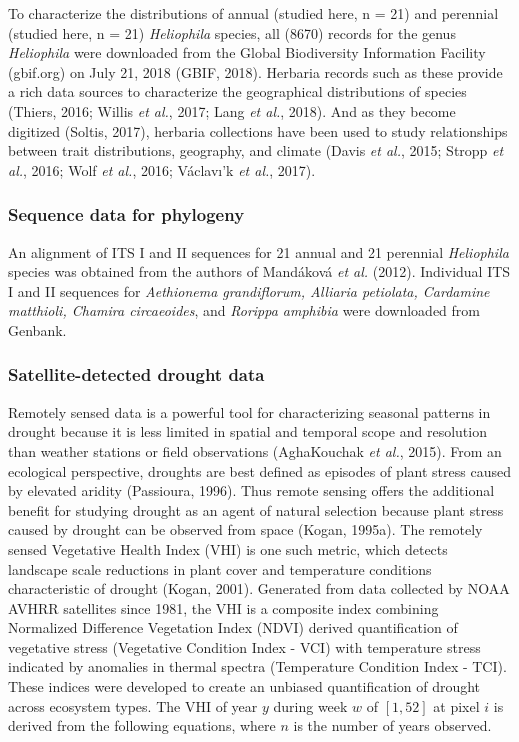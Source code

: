 \documentclass[man,floatsintext]{apa6}
\theoremstyle{definition}
\theoremstyle{definition}
\theoremstyle{definition}
\theoremstyle{remark}
\begin{document}
To characterize the distributions of annual (studied here, n = 21) and
perennial (studied here, n = 21) \emph{Heliophila} species, all (8670)
records for the genus \emph{Heliophila} were downloaded from the Global
Biodiversity Information Facility (gbif.org) on July 21, 2018 (GBIF,
2018). Herbaria records such as these provide a rich data sources to
characterize the geographical distributions of species (Thiers, 2016;
Willis \emph{et al.}, 2017; Lang \emph{et al.}, 2018). And as they
become digitized (Soltis, 2017), herbaria collections have been used to
study relationships between trait distributions, geography, and climate
(Davis \emph{et al.}, 2015; Stropp \emph{et al.}, 2016; Wolf \emph{et
al.}, 2016; Václavı'k \emph{et al.}, 2017).

\hypertarget{sequence-data-for-phylogeny}{%
\subsubsection{Sequence data for
phylogeny}\label{sequence-data-for-phylogeny}}

An alignment of ITS I and II sequences for 21 annual and 21 perennial
\emph{Heliophila} species was obtained from the authors of Mandáková
\emph{et al.} (2012). Individual ITS I and II sequences for
\emph{Aethionema grandiflorum, Alliaria petiolata, Cardamine matthioli,
Chamira circaeoides}, and \emph{Rorippa amphibia} were downloaded from
Genbank.

\hypertarget{satellite-detected-drought-data}{%
\subsubsection{Satellite-detected drought
data}\label{satellite-detected-drought-data}}

Remotely sensed data is a powerful tool for characterizing seasonal
patterns in drought because it is less limited in spatial and temporal
scope and resolution than weather stations or field observations
(AghaKouchak \emph{et al.}, 2015). From an ecological perspective,
droughts are best defined as episodes of plant stress caused by elevated
aridity (Passioura, 1996). Thus remote sensing offers the additional
benefit for studying drought as an agent of natural selection because
plant stress caused by drought can be observed from space (Kogan,
1995a). The remotely sensed Vegetative Health Index (VHI) is one such
metric, which detects landscape scale reductions in plant cover and
temperature conditions characteristic of drought (Kogan, 2001).
Generated from data collected by NOAA AVHRR satellites since 1981, the
VHI is a composite index combining Normalized Difference Vegetation
Index (NDVI) derived quantification of vegetative stress (Vegetative
Condition Index - VCI) with temperature stress indicated by anomalies in
thermal spectra (Temperature Condition Index - TCI). These indices were
developed to create an unbiased quantification of drought across
ecosystem types. The VHI of year \(y\) during week \(w\) of \([1,52]\)
at pixel \(i\) is derived from the following equations, where \(n\) is
the number of years observed.
\end{document}
